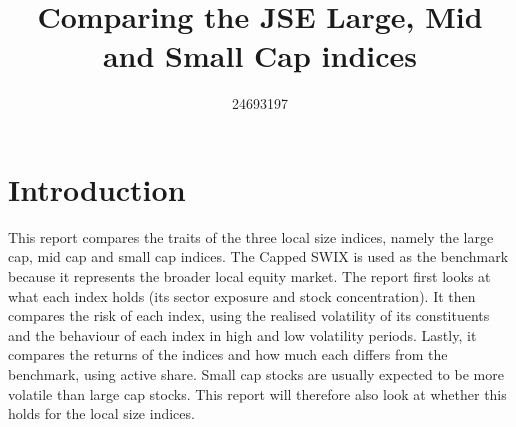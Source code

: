 \documentclass[11pt,preprint]{elsarticle}
\numberwithin{equation}{section}
\numberwithin{figure}{section}
\numberwithin{table}{section}
\begin{document}
\begin{frontmatter}  %

\title{Comparing the JSE Large, Mid and Small Cap indices}





\author[Add1]{24693197}





\address[Add1]{Stellenbosch University, Stellenbosch, South Africa}



\vspace{1cm}





\vspace{0.5cm}

\end{frontmatter}

\setcounter{footnote}{0}



\pagestyle{fancy}
\chead{}
\rhead{}
\lfoot{}
\lhead{}
\cfoot{}


\headsep 35pt %




\section{\texorpdfstring{Introduction
\label{Introduction}}{Introduction }}\label{introduction}

This report compares the traits of the three local size indices, namely
the large cap, mid cap and small cap indices. The Capped SWIX is used as
the benchmark because it represents the broader local equity market. The
report first looks at what each index holds (its sector exposure and
stock concentration). It then compares the risk of each index, using the
realised volatility of its constituents and the behaviour of each index
in high and low volatility periods. Lastly, it compares the returns of
the indices and how much each differs from the benchmark, using active
share. Small cap stocks are usually expected to be more volatile than
large cap stocks. This report will therefore also look at whether this
holds for the local size indices.
\end{document}
